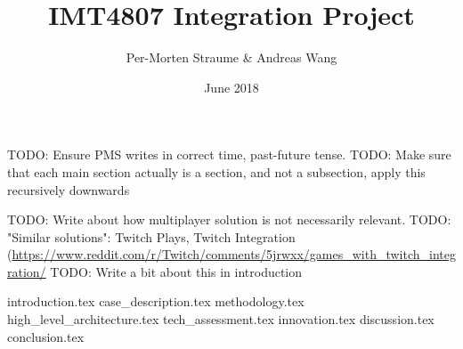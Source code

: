 \documentclass{article}
\title{IMT4807 Integration Project}
\author{Per-Morten Straume \& Andreas Wang}
\date{June 2018}
\newcommand{\todo}[1]{{\color{blue}TODO: #1}}
\begin{document}
\maketitle



\todo{Ensure PMS writes in correct time, past-future tense.}
\todo{Make sure that each main section actually is a section, and not a subsection, apply this recursively downwards}

\todo{Write about how multiplayer solution is not necessarily relevant.}
\todo{"Similar solutions": Twitch Plays, Twitch Integration (\url{https://www.reddit.com/r/Twitch/comments/5jrwxx/games_with_twitch_integration/}}
\todo{Write a bit about this in introduction}
%
%


{introduction.tex}
{case_description.tex}
{methodology.tex} %
{high_level_architecture.tex}
{tech_assessment.tex}
{innovation.tex}
{discussion.tex}
{conclusion.tex}




\end{document}
